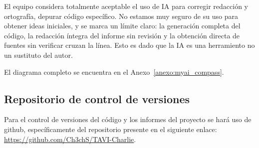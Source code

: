 El equipo considera totalmente aceptable el uso de IA para corregir redacción y ortografía, depurar código específico. No estamos muy seguro de su uso para obtener ideas iniciales, y se marca un límite claro: la generación completa del código,  la redacción íntegra del informe sin revisión y la obtención directa de fuentes sin verificar cruzan la línea. Esto es dado que la IA es una herramiento no un sustituto del autor.

El diagrama completo se encuentra en el Anexo~\ref{anexo:myai_compass}.

\subsection{Repositorio de control de versiones}

Para el control de versiones del código y los informes del proyecto se hará uso de github, específicamente del repositorio presente en el siguiente enlace: \url{https://github.com/Ch3chS/TAVI-Charlie}.